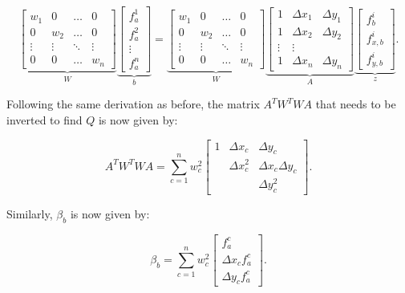 \documentclass{article}
\begin{document}
\begin{equation} \label{eq:disc_LSmatrix2}
\underbrace{\begin{bmatrix}
w_1 & 0 & \ldots & 0 \\ 0 & w_2 & \ldots & 0 \\ \vdots & \vdots & \ddots & \vdots \\ 0 & 0 & \ldots & w_n
 \end{bmatrix}}_W
\underbrace{\begin{bmatrix}
f_a^1 \\ f_a^2 \\ \vdots \\ f_a^n
 \end{bmatrix}}_b
 =
\underbrace{\begin{bmatrix}
w_1 & 0 & \ldots & 0 \\ 0 & w_2 & \ldots & 0 \\ \vdots & \vdots & \ddots & \vdots \\ 0 & 0 & \ldots & w_n
 \end{bmatrix}}_W
\underbrace{\begin{bmatrix}
1 & \Delta x_1 & \Delta y_1 \\
1 & \Delta x_2 & \Delta y_2 \\
\vdots & \vdots \\
1 & \Delta x_n & \Delta y_n
 \end{bmatrix}}_A
\underbrace{\begin{bmatrix}
f_b^i \\ f_{x,b}^i \\ f_{y,b}^i
 \end{bmatrix}}_z.
\end{equation}

Following the same derivation as before, the matrix $A^T W^T W A$ that needs to be inverted to find $Q$ is now given by:

\begin{equation}
A^T W^T W A = \sum_{c=1}^n w_c^2 \begin{bmatrix}
1 & \Delta x_c & \Delta y_c \\
& \Delta x_c^2 & \Delta x_c \Delta y_c \\
& & \Delta y_c^2
\end{bmatrix}.
\end{equation}

Similarly, $\beta_b$ is now given by:

\begin{equation}
\beta_b = \sum_{c=1}^n w_c^2 \begin{bmatrix} f_a^c \\ \Delta x_c f_ a^c \\ \Delta y_c f_a^c \end{bmatrix}.
\end{equation}
\end{document}
